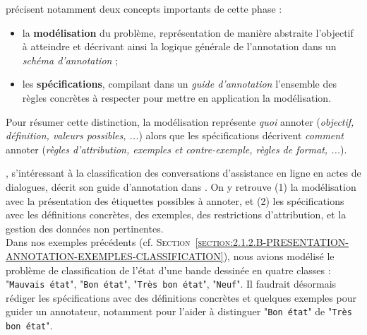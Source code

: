 			\cite{pustejovsky-stubbs:2012:natural-language-annotation} précisent notamment deux concepts importants de cette phase :
			\begin{itemize}
				\item la \textbf{modélisation} du problème, représentation de manière abstraite l'objectif à atteindre et décrivant ainsi la logique générale de l'annotation dans un \textit{schéma d'annotation} ;
				\item les \textbf{spécifications}, compilant dans un \textit{guide d'annotation} l'ensemble des règles concrètes à respecter pour mettre en application la modélisation.
			\end{itemize}
			Pour résumer cette distinction, la modélisation représente \textit{quoi} annoter (\textit{objectif, définition, valeurs possibles, ...}) alors que les spécifications décrivent \textit{comment} annoter (\textit{règles d'attribution, exemples et contre-exemple, règles de format, ...}).
			\begin{leftBarExamples}
				\cite{perrotin-etal:2018:annotation-actes-dialogue}, s'intéressant à la classification des conversations d'assistance en ligne en actes de dialogues, décrit son guide d'annotation dans \cite{asher-etal:2017:manuel-annotation-actes}.
				On y retrouve (1) la modélisation avec la présentation des étiquettes possibles à annoter, et (2) les spécifications avec les définitions concrètes, des exemples, des restrictions d'attribution, et la gestion des données non pertinentes. \\
				Dans nos exemples précédents (cf. \textsc{Section~\ref{section:2.1.2.B-PRESENTATION-ANNOTATION-EXEMPLES-CLASSIFICATION}}), nous avions modélisé le problème de classification de l'état d'une bande dessinée en quatre classes : "\texttt{Mauvais état}", "\texttt{Bon état}", "\texttt{Très bon état}", "\texttt{Neuf}".
				Il faudrait désormais rédiger les spécifications avec des définitions concrètes et quelques exemples  pour guider un annotateur, notamment pour l'aider à distinguer "\texttt{Bon état}" de "\texttt{Très bon état}".
			\end{leftBarExamples}
			
